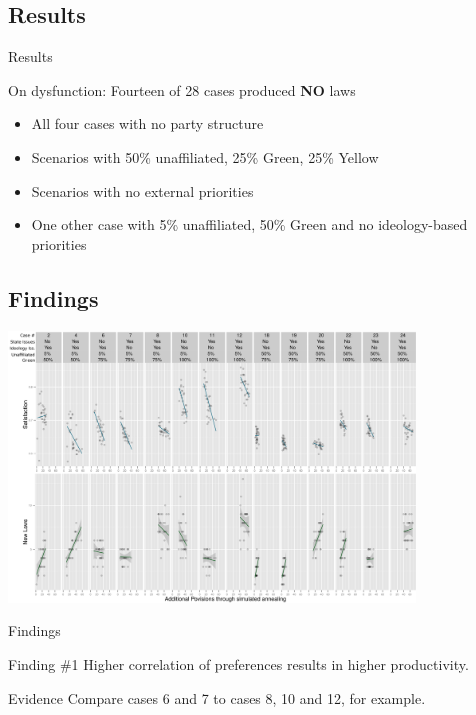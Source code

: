 \documentclass[14pt]{beamer}
\begin{document}
\subsection*{Results} %
\begin{frame}{Results}
\begin{block}{On dysfunction:}
  Fourteen of 28 cases produced \textbf{NO} laws
   \end{block}

\begin{itemize}
\item All four cases with no party structure
\item Scenarios with 50\% unaffiliated, 25\% Green, 25\% Yellow
\item Scenarios with no external priorities
\item One other case with 5\% unaffiliated, 50\% Green and no ideology-based priorities  
\end{itemize}
\end{frame}

\subsection*{Findings}

\begin{frame}
 \includegraphics[width=10.8cm]{combinedResults_newColors.png}
\end{frame}



\begin{frame}{Findings}
\begin{block}{Finding \#1}
  Higher correlation of preferences results in higher productivity.
\end{block}
\begin{block} {Evidence}
  Compare cases 6 and 7 to cases 8, 10 and 12, for example.
\end{block}
\end{frame}
\end{document}

